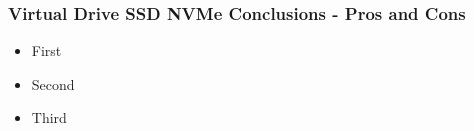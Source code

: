 \vspace*{-\baselineskip}

\newpage
\subsubsection{Virtual Drive SSD NVMe Conclusions - Pros and Cons}
\begin{itemize}
  \item First
  \item Second
  \item Third
\end{itemize}